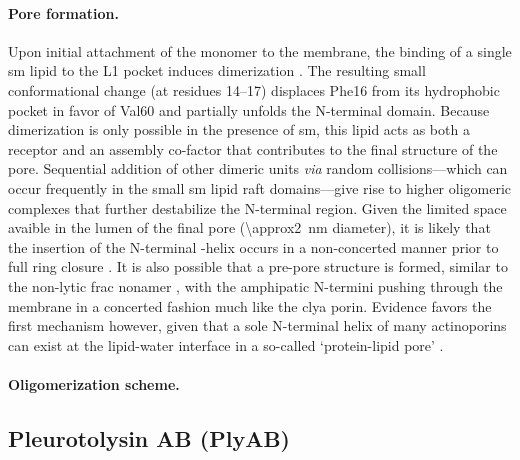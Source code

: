 \paragraph{Pore formation.}
%
Upon initial attachment of the monomer to the membrane, the binding of a single \gls{sm} lipid to the L1
pocket induces dimerization \cite{Tanaka-2015}. The resulting small conformational change (at residues 14--17)
displaces Phe16 from its hydrophobic pocket in favor of Val60 and partially unfolds the N-terminal domain.
Because dimerization is only possible in the presence of \gls{sm}, this lipid acts as both a receptor and an
assembly co-factor that contributes to the final structure of the pore. Sequential addition of other dimeric
units \textit{via} random collisions---which can occur frequently in the small \gls{sm} lipid raft
domains---give rise to higher oligomeric complexes that further destabilize the N-terminal region. Given the
limited space avaible in the lumen of the final pore (\SI{\approx2}{\nm} diameter), it is likely that the
insertion of the N-terminal \ta-helix occurs in a non-concerted manner prior to full ring closure
\cite{Cosentino-2016}. It is also possible that a pre-pore structure is formed, similar to the non-lytic
\gls{frac} nonamer \cite{Mechaly-2011}, with the amphipatic N-termini pushing through the membrane in a
concerted fashion \cite{Tanaka-2015,Rojko-2016} much like the \gls{clya} porin. Evidence favors the first
mechanism however, given that a sole N-terminal helix of many actinoporins can exist at the lipid-water
interface in a so-called `protein-lipid pore' \cite{Cosentino-2016}.


\paragraph{Oligomerization scheme.}
%

\subsection{Pleurotolysin AB (PlyAB)}

